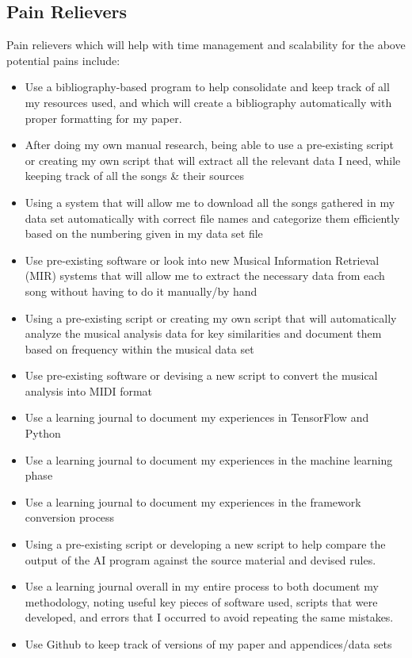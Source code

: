 \documentclass{article}
\begin{document}
\subsection{Pain Relievers}
Pain relievers which will help with time management and scalability for the above potential pains include:
\begin{itemize}
    \item Use a bibliography-based program to help consolidate and keep track of all my resources used, and which will create a bibliography automatically with proper formatting for my paper.
    \item After doing my own manual research, being able to use a pre-existing script or creating my own script that will extract all the relevant data I need, while keeping track of all the songs \& their sources
    \item Using a system that will allow me to download all the songs gathered in my data set automatically with correct file names and categorize them efficiently based on the numbering given in my data set file
    \item Use pre-existing software or look into new Musical Information Retrieval (MIR) systems that will allow me to extract the necessary data from each song without having to do it manually/by hand
    \item Using a pre-existing script or creating my own script that will automatically analyze the musical analysis data for key similarities and document them based on frequency within the musical data set
    \item Use pre-existing software or devising a new script to convert the musical analysis into MIDI format
    \item Use a learning journal to document my experiences in TensorFlow and Python
    \item Use a learning journal to document my experiences in the machine learning phase
    \item Use a learning journal to document my experiences in the framework conversion process
    \item Using a pre-existing script or developing a new script to help compare the output of the AI program against the source material and devised rules. 
    \item Use a learning journal overall in my entire process to both document my methodology, noting useful key pieces of software used, scripts that were developed, and errors that I occurred to avoid repeating the same mistakes.
    \item Use Github to keep track of versions of my paper and appendices/data sets
\end{itemize}
\end{document}
